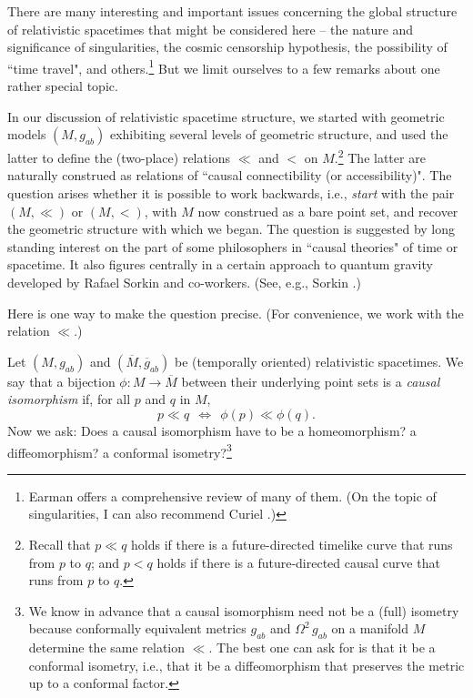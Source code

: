 \documentclass [12] {article}
\theoremstyle{plain}
\numberwithin{figure}{subsection}
\numberwithin{proposition}{subsection}
\begin{document}
There are many interesting and important issues concerning the  global structure of relativistic spacetimes that might be considered here --  the nature and significance of singularities,  the cosmic censorship hypothesis, the possibility of ``time travel", and others.\footnote{Earman  offers a comprehensive review of many of them.  (On the topic of singularities, I can also recommend  Curiel .)} But we limit ourselves to a few remarks about one rather special  topic.  

In our discussion of relativistic spacetime structure, we started with geometric models $(M, g_{ab})$ exhibiting several levels of geometric structure,  and used the latter to define the (two-place) relations $\ll $  and  $ <$  on $M$.\footnote{Recall that $p \ll q$ holds if there is a future-directed timelike curve that runs from $p$ to $q$; and $p < q$ holds if there is a future-directed causal curve that runs from $p$ to $q$.}  The latter are naturally construed as  relations of ``causal connectibility (or accessibility)".  The question arises whether it is possible to work  backwards, i.e.,  \emph{start} with the pair $(M, \ll)$ or $(M, <)$,  with $M$ now construed as a bare point set, and recover the geometric structure with which we began. The question is  suggested by long standing interest on the part of some philosophers  in  ``causal theories" of time or spacetime.   It also figures centrally in a certain approach to quantum gravity developed by Rafael  Sorkin and co-workers. (See, e.g., Sorkin .)

Here is one way to make the question precise. (For convenience, we work with the relation $ \ll $.)  

Let $(M, g_{ab})$ and $(\overline{M}, \overline{g}_{ab})$ be (temporally oriented) relativistic spacetimes. We say that a  bijection $\phi: M \rightarrow \overline{M}$ between their underlying point sets is a \emph{causal isomorphism} if, for all   $p$ and $q$ in $M$,
\begin{equation}
p \ll q   \ \  \Longleftrightarrow  \  \   \phi(p) \ll \phi(q).
\end{equation} 
Now we ask:  Does a causal isomorphism have to be a homeomorphism? a diffeomorphism? a conformal  isometry?\footnote{We know in advance that a causal isomorphism need not be a (full)  isometry because conformally equivalent metrics $g_{ab}$ and $ \Omega^2 \, g_{ab}$ on a manifold $M$ determine the same relation $\ll$.  The best one can ask for is that it be a conformal isometry, i.e., that it be a diffeomorphism that preserves the metric up to a conformal factor.}
\end{document}
